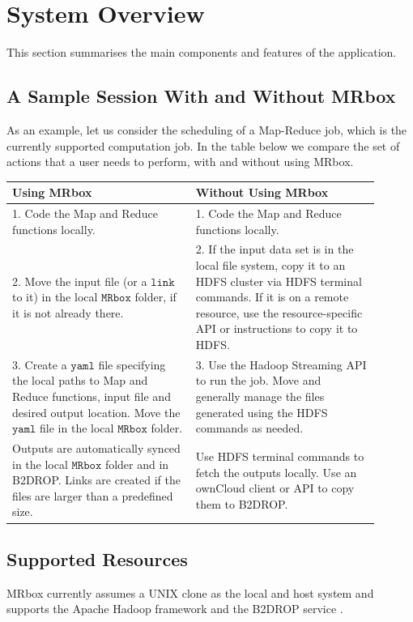\section{System Overview}
This section summarises the main components and features of the application.

\subsection{A Sample Session With and Without MRbox}
As an example, let us consider the scheduling of a Map-Reduce job, which is the currently supported computation job. In the table below we compare the set of actions that a user needs to perform, with and without using MRbox.

\vspace{.5em}\noindent
\begin{tabular}{p{0.45\linewidth}|p{0.45\linewidth}}
    \textbf{Using MRbox} & \textbf{Without Using MRbox} \\
    \hline
        1. Code the Map and Reduce functions locally. & 1. Code the Map and Reduce functions locally.\\ 
        2. Move the input file (or a $\texttt{link}$ to it) in the local $\texttt{MRbox}$ folder, if it is not already there. & 2. If the input data set is in the local file system, copy it to an HDFS cluster via HDFS terminal commands. If it is on a remote resource, use the resource-specific API or instructions to copy it to HDFS. \\ 
        3. Create a $\texttt{yaml}$ file specifying the local paths to Map and Reduce functions, input file and desired output location. Move the $\texttt{yaml}$ file in the local $\texttt{MRbox}$ folder. & 3. Use the Hadoop Streaming API to run the job. Move and generally manage the files generated using the HDFS commands as needed. \\
    \hline
        Outputs are automatically synced in the local $\texttt{MRbox}$ folder and in B2DROP. Links are created if the files are larger than a predefined size. & Use HDFS terminal commands to fetch the outputs locally. Use an ownCloud client or API to copy them to B2DROP. \\
\end{tabular}

\subsection{Supported Resources}
MRbox currently assumes a UNIX clone as the local and host system and supports the Apache Hadoop framework \cite{hadoop} and the B2DROP service \cite{b2drop}.

